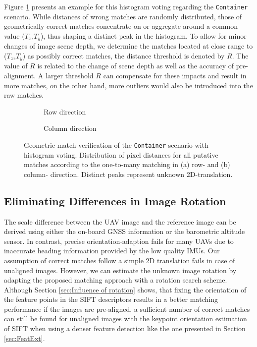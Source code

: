 Figure \ref{fig:hyps} presents an example for this histogram voting regarding the \texttt{Container} scenario. 
While distances of wrong matches are randomly distributed, those of geometrically correct matches concentrate on or aggregate around a common value ($T_x$,$T_y$), thus shaping a distinct peak in the histogram. 
To allow for minor changes of image scene depth, we determine the matches located at close range to ($T_x$,$T_y$) as possibly correct matches, the distance threshold is denoted by $R$. 
The value of $R$ is related to the change of scene depth as well as the accuracy of pre-alignment. 
A larger threshold $R$ can compensate for these impacts and result in more matches, on the other hand, more outliers would also be introduced into the raw matches. 

\begin{figure}[tbp]
    \centering
       \begin{subfigure}[b]{0.42\linewidth}
	       \centering
			\caption{Row direction}
       \end{subfigure}
       \hspace{0.07\columnwidth}
       \begin{subfigure}[b]{0.42\linewidth}  
	       \centering
			\caption{Column direction}
       \end{subfigure}
       \caption{Geometric match verification of the \texttt{Container} scenario with histogram voting. Distribution of pixel distances for all putative matches according to the one-to-many matching in (a) row- and (b) column- direction. Distinct peaks represent unknown 2D-translation.}
       \label{fig:hyps}
\end{figure}


\subsection{Eliminating Differences in Image Rotation}\label{sec:Rot}

The scale difference between the UAV image and the reference image can be derived using either the on-board GNSS information or the barometric altitude sensor.
In contrast, precise orientation-adaption fails for many UAVs due to inaccurate heading information provided by the low quality IMUs. 
Our assumption of correct matches follow a simple 2D translation fails in case of unaligned images. 
However, we can estimate the unknown image rotation by adapting the proposed matching approach with a rotation search scheme.
Although Section \ref{sec:Influence of rotation} shows, that fixing the orientation of the feature points in the SIFT descriptors results in a better matching performance if the images are pre-aligned, a sufficient number of correct matches can still be found for unaligned images with the keypoint orientation estimation of SIFT when using a denser feature detection like the one presented in Section \ref{sec:FeatExt}.

